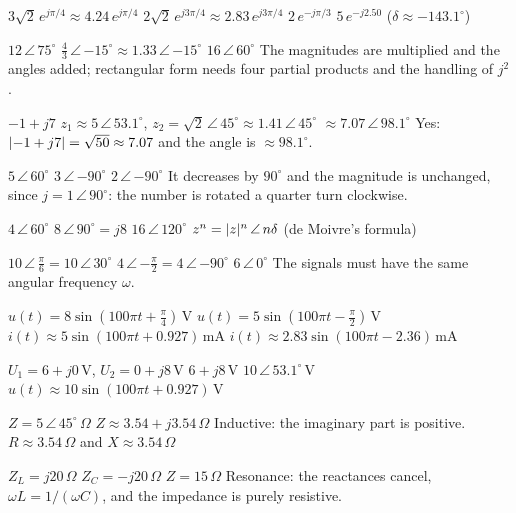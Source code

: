 \begin{facit}
  $3\sqrt{2}\,e^{j\pi/4} \approx 4.24\,e^{j\pi/4}$
 $2\sqrt{2}\,e^{j3\pi/4} \approx 2.83\,e^{j3\pi/4}$
 $2\,e^{-j\pi/3}$  $5\,e^{-j2.50}$ ($\delta \approx -143.1^{\circ}$)

  $12\,\angle\,75^{\circ}$
 $\frac{4}{3}\,\angle\,{-15^{\circ}} \approx 1.33\,\angle\,{-15^{\circ}}$
 $16\,\angle\,60^{\circ}$
 The magnitudes are multiplied and the angles added; rectangular form needs four partial
products and the handling of $j^2$.

  $-1 + j7$
 $z_1 \approx 5\,\angle\,53.1^{\circ}$, $z_2 = \sqrt{2}\,\angle\,45^{\circ} \approx
1.41\,\angle\,45^{\circ}$
 $\approx 7.07\,\angle\,98.1^{\circ}$
 Yes: $\lvert-1 + j7\rvert = \sqrt{50} \approx 7.07$ and the angle is $\approx 98.1^{\circ}$.

  $5\,\angle\,60^{\circ}$  $3\,\angle\,{-90^{\circ}}$
 $2\,\angle\,{-90^{\circ}}$
 It decreases by $90^{\circ}$ and the magnitude is unchanged, since
$j = 1\,\angle\,90^{\circ}$: the number is rotated a quarter turn clockwise.

  $4\,\angle\,60^{\circ}$  $8\,\angle\,90^{\circ} = j8$
 $16\,\angle\,120^{\circ}$  $z^n = \lvert z\rvert^n\,\angle\,n\delta$ (de Moivre's formula)

  $10\,\angle\,\frac{\pi}{6} = 10\,\angle\,30^{\circ}$
 $4\,\angle\,{-\frac{\pi}{2}} = 4\,\angle\,{-90^{\circ}}$
 $6\,\angle\,0^{\circ}$
 The signals must have the same angular frequency $\omega$.

  $u(t) = 8\sin\left(100\pi t + \frac{\pi}{4}\right)\,\text{V}$
 $u(t) = 5\sin\left(100\pi t - \frac{\pi}{2}\right)\,\text{V}$
 $i(t) \approx 5\sin(100\pi t + 0.927)\,\text{mA}$
 $i(t) \approx 2.83\sin(100\pi t - 2.36)\,\text{mA}$

  $U_1 = 6 + j0\,\text{V}$, $U_2 = 0 + j8\,\text{V}$  $6 + j8\,\text{V}$
 $10\,\angle\,53.1^{\circ}\,\text{V}$
 $u(t) \approx 10\sin(100\pi t + 0.927)\,\text{V}$

  $Z = 5\,\angle\,45^{\circ}\,\Omega$  $Z \approx 3.54 + j3.54\,\Omega$
 Inductive: the imaginary part is positive.
 $R \approx 3.54\,\Omega$ and $X \approx 3.54\,\Omega$

  $Z_L = j20\,\Omega$  $Z_C = -j20\,\Omega$  $Z = 15\,\Omega$
 Resonance: the reactances cancel, $\omega L = 1/(\omega C)$, and the impedance is purely
resistive.


\end{facit}
